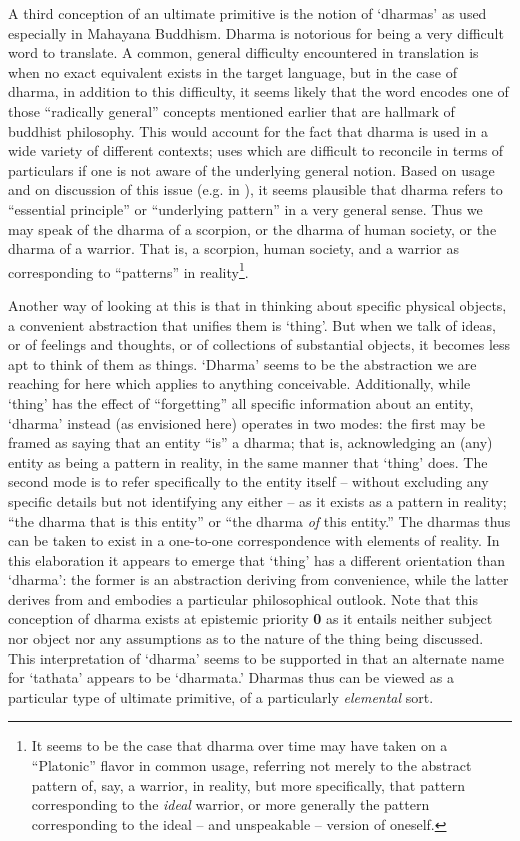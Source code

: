 \documentclass[pra,twocolumn,groupedaddress,10pt]{revtex4}
\theoremstyle{definition}
\begin{document}
A third conception of an ultimate primitive is the notion of `dharmas' as used especially in Mahayana Buddhism. Dharma is notorious for being a very difficult word to translate. A common, general difficulty encountered in translation is when no exact equivalent exists in the target language, but in the case of dharma, in addition to this difficulty, it seems likely that the word encodes one of those ``radically general'' concepts mentioned earlier that are hallmark of buddhist philosophy. This would account for the fact that dharma is used in a wide variety of different contexts; uses which are difficult to reconcile in terms of particulars if one is not aware of the underlying general notion. Based on usage and on discussion of this issue (e.g. in \cite{dharmadhatu}), it seems plausible that dharma refers to ``essential principle'' or ``underlying pattern'' in a very general sense. Thus we may speak of the dharma of a scorpion, or the dharma of human society, or the dharma of a warrior. That is, a scorpion, human society, and a warrior as corresponding to ``patterns'' in reality\footnote{It seems to be the case that dharma over time may have taken on a ``Platonic'' flavor in common usage, referring not merely to the abstract pattern of, say, a warrior, in reality, but more specifically, that pattern corresponding to the \emph{ideal} warrior, or more generally the pattern corresponding to the ideal -- and unspeakable -- version of oneself.}.

Another way of looking at this is that in thinking about specific physical objects, a convenient abstraction that unifies them is `thing'. But when we talk of ideas, or of feelings and thoughts, or of collections of substantial objects, it becomes less apt to think of them as things. `Dharma' seems to be the abstraction we are reaching for here which applies to anything conceivable. Additionally, while `thing' has the effect of ``forgetting'' all specific information about an entity, `dharma' instead (as envisioned here) operates in two modes: the first may be framed as saying that an entity ``is'' a dharma; that is, acknowledging an (any) entity as being a pattern in reality, in the same manner that `thing' does. The second mode is to refer specifically to the entity itself -- without excluding any specific details but not identifying any either -- as it exists as a pattern in reality; ``the dharma that is this entity'' or ``the dharma \emph{of} this entity.'' The dharmas thus can be taken to exist in a one-to-one correspondence with elements of reality. In this elaboration it appears to emerge that `thing' has a different orientation than `dharma': the former is an abstraction deriving from convenience, while the latter derives from and embodies a particular philosophical outlook. Note that this conception of dharma exists at epistemic priority \textbf{0} as it entails neither subject nor object nor any assumptions as to the nature of the thing being discussed. This interpretation of `dharma' seems to be supported in that an alternate name for `tathata' appears to be `dharmata.' Dharmas thus can be viewed as a particular type of ultimate primitive, of a particularly \emph{elemental} sort.
\end{document}
